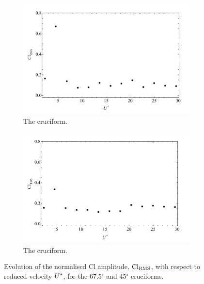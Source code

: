 \documentclass[oneside]{utmthesis}
\begin{document}
\begin{figure}
  \centering
  \begin{subfigure}[h]{1\textwidth}
    \includegraphics[width=\textwidth]{figs/clRMS4}
    \caption{The \angfo{} cruciform.}
    \label{fig:clRMS4}
  \end{subfigure}
  
  \begin{subfigure}[h]{1\textwidth}
    \includegraphics[width=\textwidth]{figs/clRMS3}
    \caption{The \angth{} cruciform.}
    \label{fig:clRMS3}
  \end{subfigure}

  \label{fig:clRMS43}
  \caption{Evolution of the normalised Cl \rms{} amplitude, $\text{Cl}_{\text{RMS}}$, with respect to reduced velocity $U^{*}$, for the 67.5$^{\circ}$ and 45$^{\circ}$ cruciforms.}
\end{figure}
\end{document}
